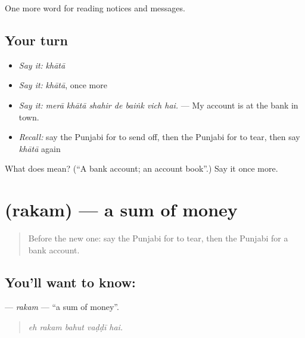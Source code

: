 \begin{grammarlens}[title={What you've built}]
One more word for reading notices and messages.
\end{grammarlens}

\subsection*{Your turn}
\begin{itemize}
\raggedright
  \item \emph{Say it:} \emph{khātā}
  \item \emph{Say it:} \emph{khātā}, once more
  \item \emph{Say it:} \emph{merā khātā shahir de baiṅk vich hai.} — My account is at the bank in town.
  \item \emph{Recall:} say the Punjabi for to send off, then the Punjabi for to tear, then say \emph{khātā} again
\end{itemize}

\begin{tcolorbox}[breakable,colback=teal!4,colframe=teal!35!black,title={Before you move on}]
What does  mean? (\textquotedblleft{}A bank account; an account book\textquotedblright{}.) Say it once more.
\end{tcolorbox}
\section[\texorpdfstring{\pa{ਰਕਮ} (rakam)}{ਰਕਮ (rakam)}]{ (rakam) — a sum of money}

\label{lesson:PA-C257-rakam}



\begin{quote}
Before the new one: say the Punjabi for to tear, then the Punjabi for a bank account.
\end{quote}

\subsection*{You'll want to know: }
\textbf{} — \emph{rakam} — \textquotedblleft{}a sum of money\textquotedblright{}.

\begin{quote}
    
\end{quote}

\begin{quote}
\emph{eh rakam bahut vaḍḍī hai.}
\end{quote}

